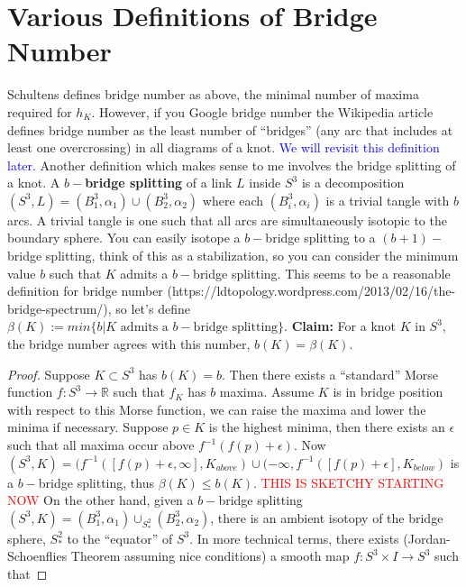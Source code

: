 \documentclass[11pt, oneside]{article}
\begin{document}
\section*{Various Definitions of Bridge Number}
Schultens defines bridge number as above, the minimal number of maxima required for $h_{K}.$ However, if you Google bridge number the Wikipedia article defines bridge number as the least number of ``bridges'' (any arc that includes at least one overcrossing) in all diagrams of a knot. \textcolor{blue}{We will revisit this definition later.} Another definition which makes sense to me involves the bridge splitting of a knot. \newline \newline A \textbf{$b-$bridge splitting} of a link $L$ inside $S^{3}$ is a decomposition $(S^{3}, L) = (B_{1}^{3}, \alpha_{1}) \cup (B_{2}^{3}, \alpha_{2})$ where each $(B_{i}^{3}, \alpha_{i})$ is a trivial tangle with $b$ arcs. A trivial tangle is one such that all arcs are simultaneously isotopic to the boundary sphere. You can easily isotope a $b-$bridge splitting to a $(b+1)-$bridge splitting, think of this as a stabilization, so you can consider the minimum value $b$ such that $K$ admits a $b-$bridge splitting. This seems to be a reasonable definition for bridge number (https://ldtopology.wordpress.com/2013/02/16/the-bridge-spectrum/), so let's define $\beta(K) := min\{b | K \text{ admits a $b-$bridge splitting}\}.$ \newline \newline \textbf{Claim:} For a knot $K$ in $S^{3},$ the bridge number agrees with this number, $b(K) = \beta(K).$ \begin{proof}Suppose $K \subset S^{3}$ has $b(K) = b.$ Then there exists a ``standard'' Morse function $f: S^{3} \rightarrow \mathbb{R}$ such that $f_{K}$ has $b$ maxima. Assume $K$ is in bridge position with respect to this Morse function, we can raise the maxima and lower the minima if necessary. Suppose $p \in K$ is the highest minima, then there exists an $\epsilon$ such that all maxima occur above $f^{-1}(f(p) + \epsilon)$. Now  $(S^{3}, K) = (f^{-1}([f(p) + \epsilon, \infty], K_{above}) \cup (-\infty, f^{-1}([f(p) + \epsilon], K_{below})$ is a $b-$bridge splitting, thus $\beta(K) \leq b(K)$. \textcolor{red}{THIS IS SKETCHY STARTING NOW} On the other hand, given a $b-$bridge splitting $(S^{3}, K) = (B_{1}^{3}, \alpha_{1}) \cup_{S^{2}_{*}} (B_{2}^{3}, \alpha_{2})$, there is an ambient isotopy of the bridge sphere, $S^{2}_{*}$ to the ``equator'' of $S^{3}.$ In more technical terms, there exists (Jordan-Schoenflies Theorem assuming nice conditions) a smooth map $f: S^{3} \times I \rightarrow S^{3}$ such that 

\end{proof}
\end{document}
